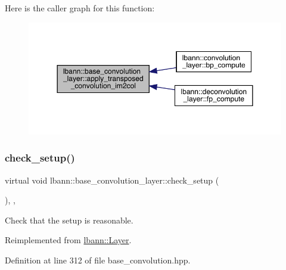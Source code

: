Here is the caller graph for this function\+:\nopagebreak
\begin{figure}[H]
\begin{center}
\leavevmode
\includegraphics[width=350pt]{classlbann_1_1base__convolution__layer_a87fb2bf066a98052938e48a82dcd4fd2_icgraph}
\end{center}
\end{figure}
\mbox{\label{classlbann_1_1base__convolution__layer_afa07aaa293d12cc7d28fbc8a96025900}} 
\subsubsection{\texorpdfstring{check\+\_\+setup()}{check\_setup()}}
{\footnotesize\ttfamily virtual void lbann\+::base\+\_\+convolution\+\_\+layer\+::check\+\_\+setup (\begin{DoxyParamCaption}{ }\end{DoxyParamCaption})\hspace{0.3cm}{\ttfamily [inline]}, {\ttfamily [override]}, {\ttfamily [virtual]}}

Check that the setup is reasonable. 

Reimplemented from \hyperlink{classlbann_1_1Layer_aeec1c710c3d53b5e43a4d4f67b0a21b2}{lbann\+::\+Layer}.



Definition at line 312 of file base\+\_\+convolution.\+hpp.


